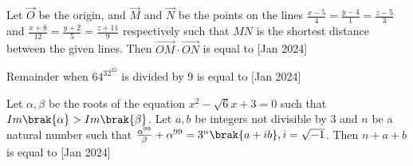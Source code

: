 \item Let $\vec{O}$ be the origin, and $\vec{M}$ and $\vec{N}$ be the points on the lines $\frac{x-5}{4}=\frac{y-4}{1}=\frac{z-5}{3}$ and $\frac{x+8}{12}=\frac{y+2}{5}=\frac{z+11}{9}$ respectively such that $MN$ is the shortest distance between the given lines. Then $\overrightarrow{OM}\cdot\overrightarrow{ON}$ is equal to \hfill{[Jan 2024]}

\item Remainder when $64^{{32}^{32}}$ is divided by 9 is equal to \hfill{[Jan 2024]}

\item Let $\alpha,\beta$ be the roots of the equation $x^2-\sqrt{6}x+3=0$ such that $Im\brak{\alpha}>Im\brak{\beta}$. Let $a,b$ be integers not divisible by 3 and $n$ be a natural number such that $\frac{\alpha^{99}}{\beta}+\alpha^{99}=3^n\brak{a+ib},i=\sqrt{-1}$. Then $n+a+b$ is equal to \hfill{[Jan 2024]}
%


